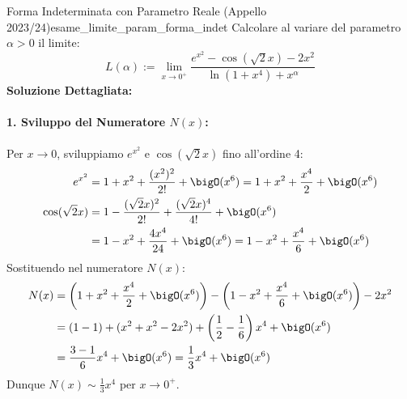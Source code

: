 \begin{esempio}{Forma Indeterminata con Parametro Reale (Appello 2023/24)}{esame_limite_param_forma_indet}
Calcolare al variare del parametro $\alpha > 0$ il limite:
\[
    L(\alpha) := \lim_{x \to 0^+} \frac{e^{x^2} - \cos(\sqrt{2}x) - 2x^2}{\ln(1 + x^4) + x^\alpha}
\]
\tcblower
\textbf{Soluzione Dettagliata:}

\paragraph{1. Sviluppo del Numeratore $N(x)$:}
Per $x \to 0$, sviluppiamo $e^{x^2}$ e $\cos(\sqrt{2}x)$ fino all'ordine 4:
\begin{align*}
    e^{x^2} &= 1 + x^2 + \frac{(x^2)^2}{2!} + \bigO(x^6) = 1 + x^2 + \frac{x^4}{2} + \bigO(x^6) \\
    \cos(\sqrt{2}x) &= 1 - \frac{(\sqrt{2}x)^2}{2!} + \frac{(\sqrt{2}x)^4}{4!} + \bigO(x^6) \\
    &= 1 - x^2 + \frac{4x^4}{24} + \bigO(x^6) = 1 - x^2 + \frac{x^4}{6} + \bigO(x^6)
\end{align*}
Sostituendo nel numeratore $N(x)$:
\begin{align*}
    N(x) &= \left(1 + x^2 + \frac{x^4}{2} + \bigO(x^6)\right) - \left(1 - x^2 + \frac{x^4}{6} + \bigO(x^6)\right) - 2x^2 \\
    &= (1 - 1) + (x^2 + x^2 - 2x^2) + \left(\frac{1}{2} - \frac{1}{6}\right)x^4 + \bigO(x^6) \\
    &= \frac{3 - 1}{6}x^4 + \bigO(x^6) = \frac{1}{3}x^4 + \bigO(x^6)
\end{align*}
Dunque $N(x) \sim \frac{1}{3}x^4$ per $x \to 0^+$.


\end{esempio}
